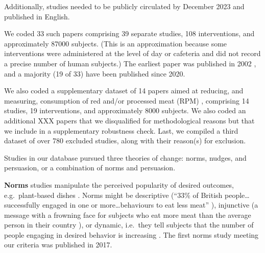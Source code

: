 \documentclass[sn-nature,pdflatex]{sn-jnl}
\begin{document}
Additionally, studies needed to be publicly circulated by December 2023
and published in English.

We coded 33 such papers
\citep{aldoh2023, allen2002, alblas2023, coker2022, griesoph2021, piester2020, sparkman2017, sparkman2020, andersson2021, kanchanachitra2020, bochmann2017, bschaden2020, cooney2016, feltz2022, haile2021, mathur2021effectiveness, peacock2017, polanco2022, sparkman2021, abrahamse2007, acharya2004, berndsen2005, bertolaso2015, bianchi2022, fehrenbach2015, hatami2018, jalil2023, merrill2009, norris2014, weingarten2022, carfora2023, hennessy2016, mattson2020}
comprising 39 separate studies, 108 interventions, and approximately
87000 subjects. (This is an approximation because some interventions
were administered at the level of day or cafeteria and did not record a
precise number of human subjects.) The earliest paper was published in
2002 \citep{allen2002}, and a majority (19 of 33) have been published
since 2020.

We also coded a supplementary dataset of 14 papers aimed at reducing,
and measuring, consumption of red and/or processed meat (RPM)
\citep{carfora2017correlational, carfora2017randomised, carfora2019, carfora2019informational, delichatsios2001, dijkstra2022, emmons2005cancer, emmons2005project, jaacks2014, james2015, lee2018, perino2022, schatzkin2000, sorensen2005},
comprising 14 studies, 19 interventions, and approximately 8000
subjects. We also coded an additional XXX papers that we disqualified
for methodological reasons but that we include in a supplementary
robustness check. Last, we compiled a third dataset of over 780 excluded
studies, along with their reason(s) for exclusion.

Studies in our database pursued three theories of change: norms, nudges,
and persuasion, or a combination of norms and persuasion.

\textbf{Norms} studies
\citep{aldoh2023, allen2002, alblas2023, coker2022, griesoph2021, piester2020, sparkman2017, sparkman2020}
manipulate the perceived popularity of desired outcomes,
e.g.~plant-based dishes \citep{sparkman2017}. Norms might be descriptive
(``33\% of British people\ldots successfully engaged in one or
more\ldots behaviours to eat less meat'' \citep{aldoh2023}), injunctive
(a message with a frowning face for subjects who eat more meat than the
average person in their country \citep{alblas2023}), or dynamic,
i.e.~they tell subjects that the number of people engaging in desired
behavior is increasing
\citep{aldoh2023, coker2022, sparkman2017, sparkman2020}. The first
norms study meeting our criteria was published in 2017.
\end{document}
